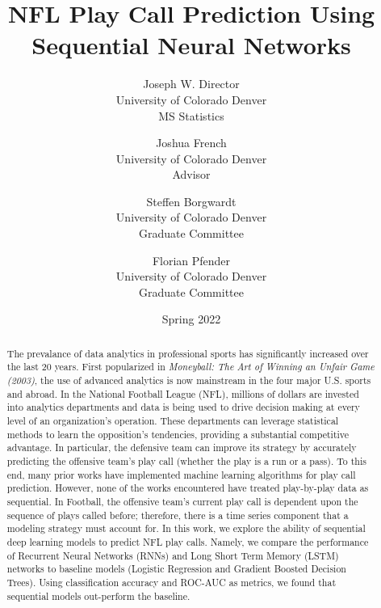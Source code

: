 \documentclass[11pt]{article}
\title{NFL Play Call Prediction Using Sequential Neural Networks}
\author{Joseph W. Director  \\
	University of Colorado Denver \\
    MS Statistics
	\and 
	Joshua French \\
    University of Colorado Denver \\
    Advisor
    \and
    Steffen Borgwardt \\
    University of Colorado Denver \\
    Graduate Committee
    \and
    Florian Pfender \\
    University of Colorado Denver \\
    Graduate Committee
	}
\date{Spring 2022}
\begin{document}
    
    \maketitle

    \begin{abstract}
        \centering\begin{minipage}{\dimexpr\paperwidth-12cm}
        The prevalance of data analytics in professional sports has significantly increased over the last 20 years. 
        First popularized in \emph{Moneyball: The Art of Winning an Unfair Game (2003)}, the use of advanced analytics is now mainstream in the four major U.S. sports and abroad. 
        In the National Football League (NFL), millions of dollars are invested into analytics departments and data is being used to drive decision making at every level of an organization's operation. 
        These departments can leverage statistical methods to learn the opposition's tendencies, providing a substantial competitive advantage. 
        In particular, the defensive team can improve its strategy by accurately predicting the offensive team's play call (whether the play is a run or a pass). 
        To this end, many prior works have implemented machine learning algorithms for play call prediction. 
        However, none of the works encountered have treated play-by-play data as sequential. 
        In Football, the offensive team's current play call is dependent upon the sequence of plays called before; therefore, there is a time series component that a modeling strategy must account for. 
        In this work, we explore the ability of sequential deep learning models to predict NFL play calls.
        Namely, we compare the performance of Recurrent Neural Networks (RNNs) and Long Short Term Memory (LSTM) networks to baseline models (Logistic Regression and Gradient Boosted Decision Trees). 
        Using classification accuracy and ROC-AUC as metrics, we found that sequential models out-perform the baseline. 
        \end{minipage}
    \end{abstract}
    
    \pagebreak

    \tableofcontents
    \newpage

\end{document}
